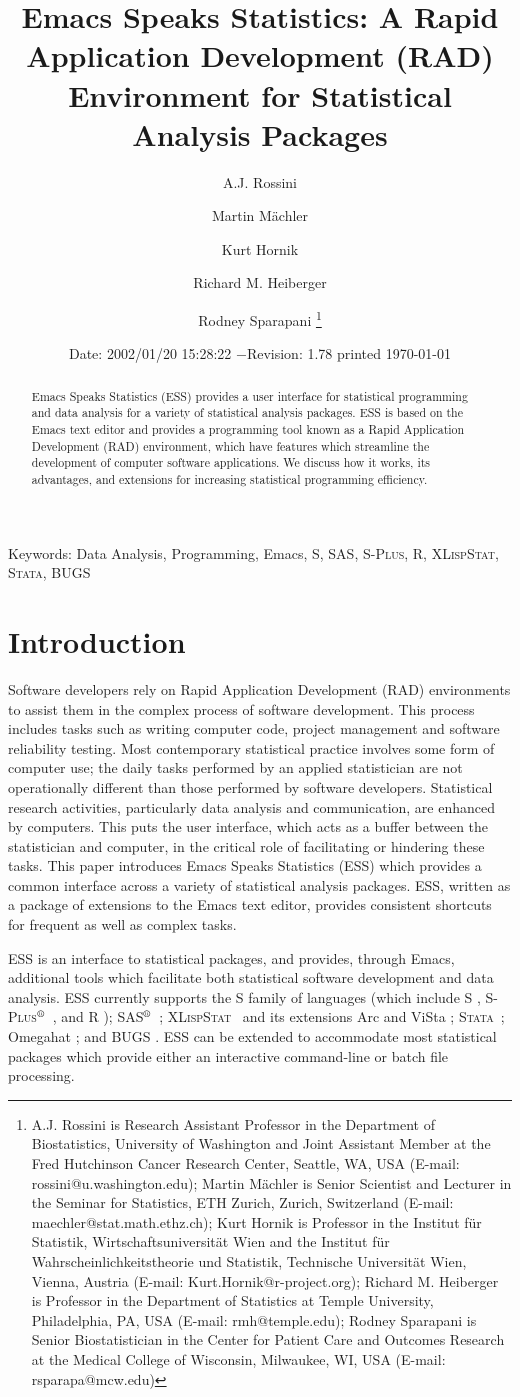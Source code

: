 \documentclass{article}
\title{Emacs Speaks Statistics:  A Rapid Application Development (RAD)
  Environment for Statistical Analysis Packages}
\author{A.J. Rossini \and Martin M{\"a}chler \and Kurt Hornik \and Richard
  M. Heiberger \and Rodney Sparapani \footnote{%
    A.J. Rossini is Research Assistant Professor in the Department of
    Biostatistics, University of Washington and Joint Assistant Member at
    the Fred Hutchinson Cancer Research Center, Seattle, WA, USA
    (E-mail: rossini@u.washington.edu);
    Martin M{\"a}chler is Senior Scientist and Lecturer in the Seminar for
    Statistics, ETH Zurich, Zurich, Switzerland
    (E-mail: maechler@stat.math.ethz.ch);
    Kurt Hornik is Professor in the Institut f{\"u}r Statistik,
    Wirtschaftsuniversit{\"a}t Wien and the Institut f{\"u}r
    Wahrscheinlichkeitstheorie und Statistik, Technische Universit{\"a}t
    Wien, Vienna, Austria (E-mail: Kurt.Hornik@r-project.org);
    Richard M. Heiberger is Professor in the Department of Statistics at
    Temple University, Philadelphia, PA, USA (E-mail: rmh@temple.edu);
    Rodney Sparapani is Senior Biostatistician in the Center for Patient
    Care and Outcomes Research at the Medical College of Wisconsin, 
    Milwaukee, WI, USA (E-mail: rsparapa@mcw.edu)}}
\date{$ $Date: 2002/01/20 15:28:22 $ - $Revision: 1.78 $ $\tiny printed \today}
\newif\ifdraft
\renewcommand{\baselinestretch}{1.5}
\newcommand*{\regstrd}{$^{\mbox{\scriptsize{\textregistered}}}$}
\newcommand*{\SAS}{\textsc{SAS}}
\newcommand*{\Splus}{\textsc{S-Plus}}
\newcommand*{\XLispStat}{\textsc{XLispStat}}
\newcommand*{\Stata}{\textsc{Stata}}
\begin{document}
\ifdraft
\setcounter{page}{0}
\tableofcontents
\fi

\maketitle

\ifdraft{}%
\else%
 \renewcommand{\baselinestretch}{1.5}
\fi

\begin{abstract}
  Emacs Speaks Statistics (ESS) provides a user interface for
  statistical programming and data analysis for a variety of
  statistical analysis packages.  ESS is based on the Emacs text
  editor and provides a programming tool known as a Rapid Application
  Development (RAD) environment, which have features which streamline
  the development of computer software applications.  We discuss how
  it works, its advantages, and extensions for increasing statistical
  programming efficiency.
\end{abstract}

\noindent Keywords: Data Analysis, Programming, Emacs, S, \SAS,
\Splus, R, \XLispStat, \Stata, BUGS


\section{Introduction}
\label{sec:introduction}

Software developers rely on Rapid Application Development (RAD)
environments to assist them in the complex process of software
development.  This process includes tasks such as writing computer
code, project management and software reliability testing.  Most
contemporary statistical practice involves some form of computer use;
the daily tasks performed by an applied statistician are not
operationally different than those performed by software developers.
Statistical research activities, particularly data analysis and
communication, are enhanced by computers.  This puts the user
interface, which acts as a buffer between the statistician and
computer, in the critical role of facilitating or hindering these
tasks.  This paper introduces Emacs Speaks Statistics (ESS)
\citep{ESS} which provides a common interface across a variety of
statistical analysis packages.  ESS, written as a package of
extensions to the Emacs text editor, provides consistent shortcuts for
frequent as well as complex tasks.

ESS is an interface to statistical packages, and provides,
through Emacs, additional tools which facilitate both statistical
software development and data analysis.  ESS currently supports
the S family of languages (which include
S \citep{BecRCW88,ChaJH92,ChaJ98}, \Splus\regstrd\ \citep{Splus}, and R
\citep{ihak:gent:1996}); \SAS\regstrd\ \citep{SAS:8}; \XLispStat\
\citep{Tier90} and its extensions Arc \citep{Cook:Weisberg:1999} and
ViSta \citep{youn:fald:mcfa:1992}; \Stata\ \citep{Stata:6.0}; Omegahat
\citep{DTLang:2000}; and BUGS \citep{BUGS}.  ESS can be
extended to accommodate most statistical packages which provide either
an interactive command-line or batch file processing.
\end{document}

